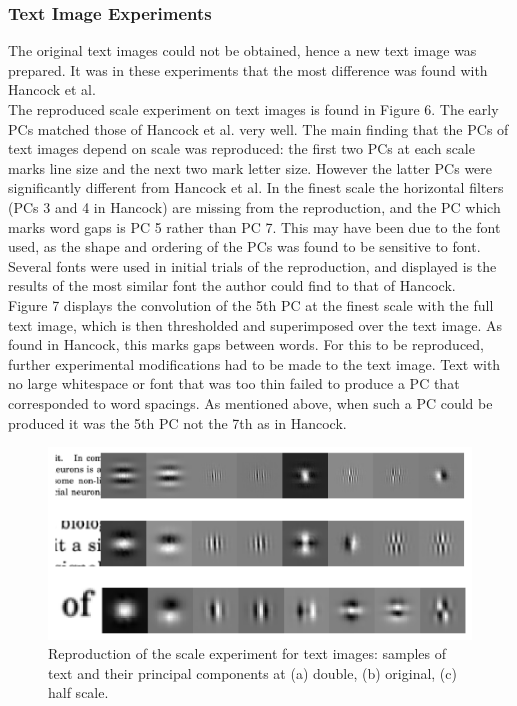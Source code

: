 \subsubsection{Text Image Experiments}
The original text images could not be obtained, hence a new text image was prepared. It was in these experiments that the most difference was found with Hancock et al.\\
The reproduced scale experiment on text images is found in Figure 6. The early PCs matched those of Hancock et al. very well. The main finding that the PCs of text images depend on scale was reproduced: the first two PCs at each scale marks line size and the next two mark letter size. However the latter PCs were significantly different from Hancock et al. In the finest scale the horizontal filters (PCs 3 and 4 in Hancock) are missing from the reproduction, and the PC which marks word gaps is PC 5 rather than PC 7. This may have been due to the font used, as the shape and ordering of the PCs was found to be sensitive to font. Several fonts were used in initial trials of the reproduction, and displayed is the results of the most similar font the author could find to that of Hancock.\\
Figure 7 displays the convolution of the 5th PC at the finest scale with the full text image, which is then thresholded and superimposed over the text image. As found in Hancock, this marks gaps between words. For this to be reproduced, further experimental modifications had to be made to the text image. Text with no large whitespace or font that was too thin failed to produce a PC that corresponded to word spacings. As mentioned above, when such a PC could be produced it was the 5th PC not the 7th as in Hancock. 
\begin{figure}
    \centering
    \includegraphics[scale=0.55]{figures/Figure6.png}
    \caption{Reproduction of the scale experiment for text images: samples of text and their principal components at (a) double, (b) original, (c) half scale.}
    \label{fig:Figure6}
\end{figure}
